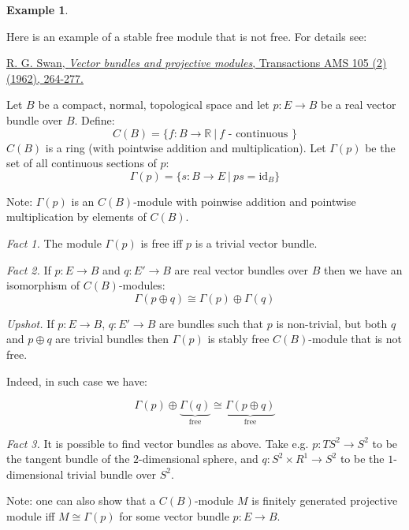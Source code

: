 \documentclass[12pt, letterpaper, oneside]{article}
\theoremstyle{plain}
\theoremstyle{definition}
\newtheorem{example}[theorem]{Example}
\newcommand{\R}{{\mathbb R}}
\newcommand{\id}{\mathrm{id}}
\newcommand{\vs}{\vskip 5mm}
\begin{document}
\begin{example} \ 

Here is an example of a stable free module that is not free. For details see:
 
\href{http://www.ams.org/journals/tran/1962-105-02/S0002-9947-1962-0143225-6/S0002-9947-1962-0143225-6.pdf}{ 
R. G. Swan, \emph{Vector bundles and projective modules}, 
Transactions AMS 105 (2) (1962), 264-277.}




\vs 

Let $B$ be a compact, normal, topological space and let $p\colon E \to B$ be a real 
vector bundle over $B$. Define: 
$$C(B) = \{ f\colon B \to \R \ | \ f \text{ - continuous }\}$$
$C(B)$ is a ring (with pointwise addition and multiplication). Let $\Gamma(p)$
be the set of all continuous sections of $p$:
$$\Gamma(p) = \{ s\colon B \to E \ | \ ps = \id_{B} \}$$

Note: $\Gamma(p)$ is an $C(B)$-module with poinwise addition and pointwise 
multiplication by elements of $C(B)$.

\vs

\emph{Fact 1.} The module $\Gamma(p)$ is free iff $p$ is a trivial vector bundle. 

\emph{Fact 2.} If $p\colon E\to B$ and $q\colon E'\to B$ are real vector bundles 
over $B$ then we have an isomorphism of $C(B)$-modules:
$$\Gamma(p\oplus q) \cong \Gamma(p)\oplus \Gamma(q)$$


\vs

\emph{Upshot.}  If $p\colon E \to B$, $q\colon E'\to B$ are bundles such that 
$p$ is non-trivial, but both $q$ and $p\oplus q$ are trivial bundles then $\Gamma(p)$
is stably free $C(B)$-module that is not free. 

Indeed, in such case we have:

$$\Gamma(p)\oplus \underbrace{\Gamma(q)}_{\text{free}} 
\cong \underbrace{\Gamma(p\oplus q)}_{\text{free}}$$


\vs

 \emph{Fact 3.} It is possible to find vector bundles as above. Take e.g. 
 $p\colon TS^{2} \to S^{2}$ to be the tangent bundle of the $2$-dimensional sphere, and 
 $q\colon S^{2}\times R^{1} \to S^{2}$ to be the $1$-dimensional trivial bundle over $S^{2}$.
 
  
\vs\vs


Note: one can also show that a $C(B)$-module $M$ is finitely generated projective module iff
$M\cong \Gamma(p)$ for some vector bundle $p\colon E\to B$.   


\end{example}
\end{document}
